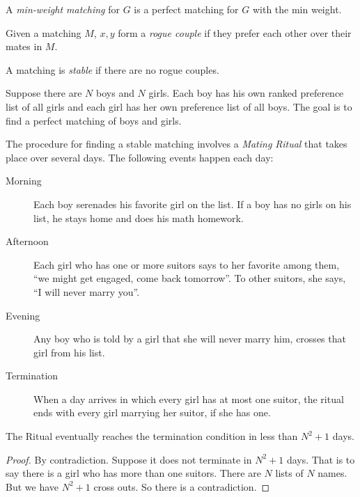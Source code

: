 \documentclass[11pt]{article}
\begin{document}
\begin{definition}
A \emph{min-weight matching} for $G$ is a perfect matching for $G$ with the min weight.
\end{definition}

\begin{definition}
Given a matching $M$, $x,y$ form a \emph{rogue couple} if they prefer each other over their mates in
$M$.
\end{definition}

\begin{definition}
A matching is \emph{stable} if there are no rogue couples.
\end{definition}

\begin{definition}
Suppose there are $N$ boys and $N$ girls. Each boy has his own ranked preference list of all girls
and each girl has her own preference list of all boys. The goal is to find a perfect matching of
boys and girls.
\end{definition}

\begin{definition}
The procedure for finding a stable matching involves a \emph{Mating Ritual} that takes place over
several days. The following events happen each day:

\begin{description}
\item[Morning] Each boy serenades his favorite girl on the list. If a boy has no girls on his
list, he stays home and does his math homework.
\item[Afternoon] Each girl who has one or more suitors says to her favorite among them, ``we might
get engaged, come back tomorrow''. To other suitors, she says, ``I will never marry you''.
\item[Evening] Any boy who is told by a girl that she will never marry him, crosses that girl from
his list.
\item[Termination] When a day arrives in which every girl has at most one suitor, the ritual ends
with every girl marrying her suitor, if she has one.
\end{description}
\end{definition}

\begin{theorem}
The Ritual eventually reaches the termination condition in less than $N^2+1$ days.
\end{theorem}

\begin{proof}
By contradiction. Suppose it does not terminate in $N^2+1$ days. That is to say there is a girl who
has more than one suitors. There are $N$ lists of $N$ names. But we have $N^2+1$ cross outs. So there
is a contradiction.
\end{proof}
\end{document}
